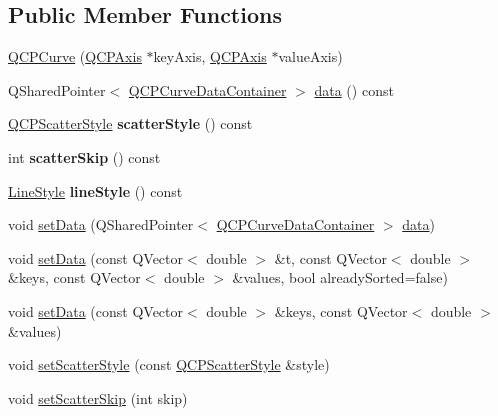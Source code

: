 \subsection*{Public Member Functions}
\begin{DoxyCompactItemize}
\item 
\hyperlink{classQCPCurve_a36de58e2652b3fa47bdf9187d421d3ce}{Q\+C\+P\+Curve} (\hyperlink{classQCPAxis}{Q\+C\+P\+Axis} $\ast$key\+Axis, \hyperlink{classQCPAxis}{Q\+C\+P\+Axis} $\ast$value\+Axis)
\item 
Q\+Shared\+Pointer$<$ \hyperlink{classQCPDataContainer}{Q\+C\+P\+Curve\+Data\+Container} $>$ \hyperlink{classQCPCurve_a761492fd00b1ab7cb18ce23c118c6c60}{data} () const
\item 
\mbox{\label{classQCPCurve_afa6bd72a3a331a5ed45d3e0c5843b592}} 
\hyperlink{classQCPScatterStyle}{Q\+C\+P\+Scatter\+Style} {\bfseries scatter\+Style} () const
\item 
\mbox{\label{classQCPCurve_a09b33217172aedf6c62c441b4ff66166}} 
int {\bfseries scatter\+Skip} () const
\item 
\mbox{\label{classQCPCurve_a06e3cf3f8f1add689254b3cda66e040e}} 
\hyperlink{classQCPCurve_a2710e9f79302152cff794c6e16cc01f1}{Line\+Style} {\bfseries line\+Style} () const
\item 
void \hyperlink{classQCPCurve_a41246850d2e080bc57183ca19cd4135e}{set\+Data} (Q\+Shared\+Pointer$<$ \hyperlink{classQCPDataContainer}{Q\+C\+P\+Curve\+Data\+Container} $>$ \hyperlink{classQCPCurve_a761492fd00b1ab7cb18ce23c118c6c60}{data})
\item 
void \hyperlink{classQCPCurve_a0768af2c33c8dcffa3cf5bdeb53923a6}{set\+Data} (const Q\+Vector$<$ double $>$ \&t, const Q\+Vector$<$ double $>$ \&keys, const Q\+Vector$<$ double $>$ \&values, bool already\+Sorted=false)
\item 
void \hyperlink{classQCPCurve_a9d3245d43304226e013240c94802f7f6}{set\+Data} (const Q\+Vector$<$ double $>$ \&keys, const Q\+Vector$<$ double $>$ \&values)
\item 
void \hyperlink{classQCPCurve_a55e43b44709bf50a35500644988aa706}{set\+Scatter\+Style} (const \hyperlink{classQCPScatterStyle}{Q\+C\+P\+Scatter\+Style} \&style)
\item 
void \hyperlink{classQCPCurve_a97dbfecd497e972d5f2162615e6da5be}{set\+Scatter\+Skip} (int skip)
\item 

\end{DoxyCompactItemize}
